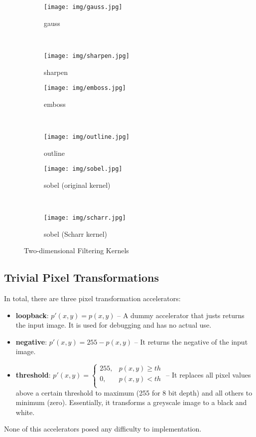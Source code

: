 \begin{figure}[tb!]
\centering
\begin{subfigure}[b]{.49\linewidth}
	\texttt{[image: img/gauss.jpg]}
	\caption{gauss}
\end{subfigure}
~
\begin{subfigure}[b]{.49\linewidth}
	\texttt{[image: img/sharpen.jpg]}
	\caption{sharpen}
\end{subfigure}
\par\bigskip
\begin{subfigure}[b]{.49\linewidth}
	\texttt{[image: img/emboss.jpg]}
	\caption{emboss}
\end{subfigure}
~
\begin{subfigure}[b]{.49\linewidth}
	\texttt{[image: img/outline.jpg]}
	\caption{outline}
\end{subfigure}
\par\bigskip
\begin{subfigure}[b]{.49\linewidth}
	\texttt{[image: img/sobel.jpg]}
	\caption{sobel (original kernel)}
\end{subfigure}
~
\begin{subfigure}[b]{.49\linewidth}
	\texttt{[image: img/scharr.jpg]}
	\caption{sobel (Scharr kernel)}
\end{subfigure}
\caption{Two-dimensional Filtering Kernels}
\label{fig:2d-filters}
\end{figure}

\subsection{Trivial Pixel Transformations}

In total, there are three pixel transformation accelerators:

\begin{itemize}
\item	\textbf{loopback}: $p'(x,y)=p(x,y)$ -- A dummy accelerator that justs returns the input image.
	It is used for debugging and has no actual use.
\item	\textbf{negative}: $p'(x,y) = 255 - p(x,y)$ -- It returns the negative of the input image.
\item	\textbf{threshold}: 
	$ p'(x,y) = \left\{
	\begin{array}{ll}
		255, 	& p(x,y) \geq th\\
		0,	& p(x,y) < th\\
	\end{array} 
	\right. 
	$ -- It replaces all pixel values above a certain threshold to maximum (255 for 8 bit
	depth) and all others to minimum (zero). Essentially, it transforms a greyscale
	image to a black and white.
\end{itemize}
None of this accelerators posed any difficulty to implementation.

